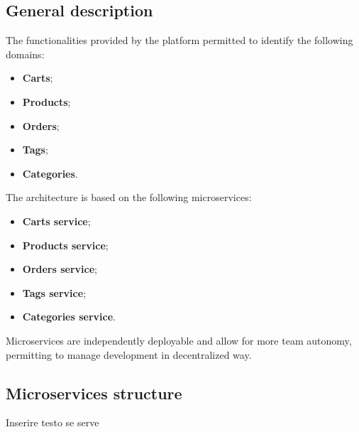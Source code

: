 \subsection{General description}
The functionalities provided by the platform permitted to identify the following domains:
\begin{itemize}
    \item \textbf{Carts};
    \item \textbf{Products};
    \item \textbf{Orders};
    \item \textbf{Tags};
    \item \textbf{Categories}.
\end{itemize}
The architecture is based on the following microservices:
\begin{itemize}
    \item \textbf{Carts service};
    \item \textbf{Products service};
    \item \textbf{Orders service};
    \item \textbf{Tags service};
    \item \textbf{Categories service}.
\end{itemize}
Microservices are independently deployable and allow for more team autonomy, permitting to manage development in decentralized way.
\pagebreak
\subsection{Microservices structure}
Inserire testo se serve
